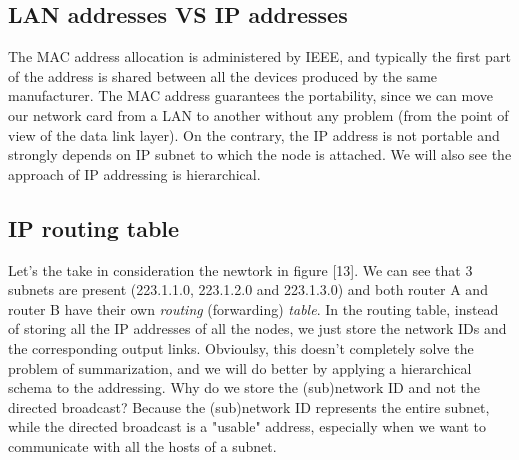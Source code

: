 \subsection{LAN addresses VS IP addresses}
The MAC address allocation is administered by IEEE, and typically the first part of the address is shared between all the devices produced by the same manufacturer. The MAC address guarantees the portability, since we can move our network card from a LAN to another without any problem (from the point of view of the data link layer). On the contrary, the IP address is not portable and strongly depends on IP subnet to which the node is attached. We will also see the approach of IP addressing is hierarchical.

\subsection{IP routing table}
Let's the take in consideration the newtork in figure [13]. We can see that 3 subnets are present (223.1.1.0, 223.1.2.0 and 223.1.3.0) and both router A and router B have their own \textit{routing} (forwarding) \textit{table}. In the routing table, instead of storing all the IP addresses of all the nodes, we just store the network IDs and the corresponding output links. Obvioulsy, this doesn't completely solve the problem of summarization, and we will do better by applying a hierarchical schema to the addressing. Why do we store the (sub)network ID and not the directed broadcast? Because the (sub)network ID represents the entire subnet, while the directed broadcast is a "usable" address, especially when we want to communicate with all the hosts of a subnet.

